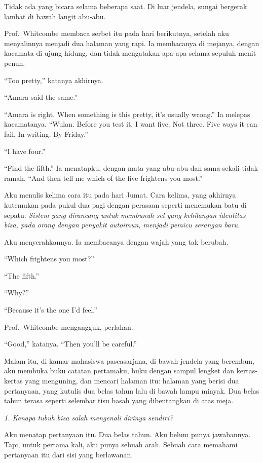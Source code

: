 \documentclass[11pt,twoside,openany]{book}
\makeatletter
\newcommand{\scenebreak}{\par\vspace{0.9em}{\centering\textsc{*\hspace{0.7em}*\hspace{0.7em}*}\par}\vspace{0.9em}\@afterindentfalse\@afterheading}
\makeatother
\begin{document}
Tidak ada yang bicara selama beberapa saat. Di luar jendela, sungai bergerak lambat di bawah langit abu-abu.

\scenebreak
Prof.~Whitcombe membaca serbet itu pada hari berikutnya, setelah aku menyalinnya menjadi dua halaman yang rapi. Ia membacanya di mejanya, dengan kacamata di ujung hidung, dan tidak mengatakan apa-apa selama sepuluh menit penuh.

``Too pretty,'' katanya akhirnya.

``Amara said the same.''

``Amara is right. When something is this pretty, it's usually wrong.'' Ia melepas kacamatanya. ``Wulan. Before you test it, I want five. Not three. Five ways it can fail. In writing. By Friday.''

``I have four.''

``Find the fifth.'' Ia menatapku, dengan mata yang abu-abu dan sama sekali tidak ramah. ``And then tell me which of the five frightens you most.''

Aku menulis kelima cara itu pada hari Jumat. Cara kelima, yang akhirnya kutemukan pada pukul dua pagi dengan perasaan seperti menemukan batu di sepatu: \emph{Sistem yang dirancang untuk membunuh sel yang kehilangan identitas bisa, pada orang dengan penyakit autoimun, menjadi pemicu serangan baru.}

Aku menyerahkannya. Ia membacanya dengan wajah yang tak berubah.

``Which frightens you most?''

``The fifth.''

``Why?''

``Because it's the one I'd feel.''

Prof.~Whitcombe mengangguk, perlahan.

``Good,'' katanya. ``Then you'll be careful.''

\scenebreak
Malam itu, di kamar mahasiswa pascasarjana, di bawah jendela yang berembun, aku membuka buku catatan pertamaku, buku dengan sampul lengket dan kertas-kertas yang menguning, dan mencari halaman itu: halaman yang berisi dua pertanyaan, yang kutulis dua belas tahun lalu di bawah lampu minyak. Dua belas tahun terasa seperti selembar tisu basah yang dibentangkan di atas meja.

\emph{1. Kenapa tubuh bisa salah mengenali dirinya sendiri?}

Aku menatap pertanyaan itu. Dua belas tahun. Aku belum punya jawabannya. Tapi, untuk pertama kali, aku punya sebuah arah. Sebuah cara memahami pertanyaan itu dari sisi yang berlawanan.
\end{document}
